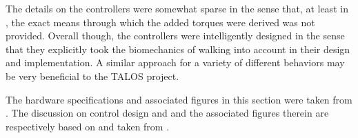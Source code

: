 \begin{refsection}
 The details on the controllers were somewhat sparse in the sense that, at least in \cite{}, the exact means through which the added torques were derived was not provided.  Overall though, the controllers were intelligently designed in the sense that they explicitly took the biomechanics of walking into account in their design and implementation.  A similar approach for a variety of different behaviors may be very beneficial to the TALOS project.  
 
 The hardware specifications and associated figures in this section were taken from \cite{mit_design_2006}.  The discussion on control design and and the associated figures therein are respectively based on and taken from \cite{mit_control_2006}. 
 
 
 \printbibliography[heading=subbibliography]

\end{refsection}

 
% 



